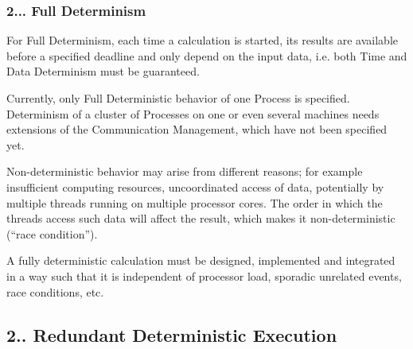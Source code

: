 \subsubsection*{2... {\bfseries Full Determinism}}


\begin{DoxyItemize}
\item For Full Determinism, each time a calculation is started, its results are available before a specified deadline and only depend on the input data, i.\+e. both Time and Data Determinism must be guaranteed.
\item Currently, only Full Deterministic behavior of one Process is specified. Determinism of a cluster of Processes on one or even several machines needs extensions of the Communication Management, which have not been specified yet.
\item Non-\/deterministic behavior may arise from different reasons; for example insufficient computing resources, uncoordinated access of data, potentially by multiple threads running on multiple processor cores. The order in which the threads access such data will affect the result, which makes it non-\/deterministic (“race condition”).
\item A fully deterministic calculation must be designed, implemented and integrated in a way such that it is independent of processor load, sporadic unrelated events, race conditions, etc.
\end{DoxyItemize}

\subsection*{2.. {\bfseries Redundant Deterministic Execution}}


